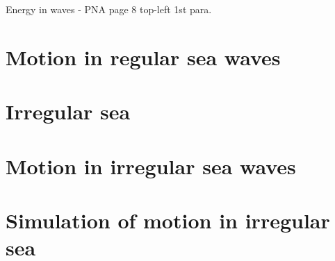 Energy in waves - PNA page 8 top-left 1st para.

\section{Motion in regular sea waves}

\section{Irregular sea}

\section{Motion in irregular sea waves}

\section{Simulation of motion in irregular sea}


